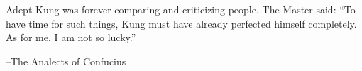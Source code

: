 \documentclass{exam}
\begin{document}
\fi


\vspace{3 in}

\ifprintanswers
\else
\begin{em}
Adept Kung was forever comparing and criticizing people.  The Master said: ``To have time for such things, Kung must have
already perfected himself completely.  As for me, I am not so lucky.''
\end{em}

\vspace{.2 cm}
\hspace{1 cm} --The Analects of Confucius

\fi
\end{document}
